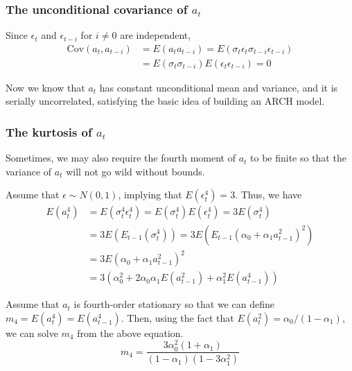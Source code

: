 \documentclass[a4paper,11pt]{article}
\newcommand{\cov}{\mathrm{Cov}}
\begin{document}
\subsubsection{The unconditional covariance of \(a_t\)}
\label{sec:orge3a2147}

Since \(\epsilon_t\) and \(\epsilon_{t-i}\) for \(i \neq 0\) are independent,
\begin{equation*}
\begin{split}
\cov(a_t, a_{t-i}) &= E(a_t a_{t-i}) = E(\sigma_t \epsilon_t \sigma_{t-i} \epsilon_{t-i}) \\
&= E(\sigma_t \sigma_{t-i}) E(\epsilon_t \epsilon_{t-i}) = 0
\end{split}
\end{equation*}

Now we know that \(a_t\) has constant unconditional mean and variance,
and it is serially uncorrelated, satisfying the basic idea of building
an ARCH model.

\subsubsection{The kurtosis of \(a_t\)}
\label{sec:org227f3ab}

Sometimes, we may also require the fourth moment of \(a_t\) to be finite
so that the variance of \(a_t\) will not go wild without bounds.

Assume that \(\epsilon \sim N(0, 1)\), implying that \(E(\epsilon^4_t) =
3\). Thus, we have
\begin{equation*}
\begin{split}
E(a^4_t) &= E(\sigma^4_t \epsilon_t^4) = E(\sigma^4_t) E(\epsilon^4_t) = 3 E(\sigma^4_t) \\
&= 3 E\left( E_{t-1}(\sigma^4_t) \right) = 3 E\left( E_{t-1}(\alpha_0 + \alpha_1 a^2_{t-1})^2  \right) \\
&= 3 E(\alpha_0 + \alpha_1 a^2_{t-1})^2 \\
&= 3\left(\alpha^2_0 + 2\alpha_0\alpha_1 E(a^2_{t-1}) + \alpha^2_1 E(a^4_{t-1}) \right)
\end{split}
\end{equation*}

Assume that \(a_t\) is fourth-order stationary so that we can define
\(m_4 = E(a^4_t) = E(a^4_{t-1})\). Then, using the fact that \(E(a^2_t) =
\alpha_0 /(1-\alpha_1)\), we can solve \(m_4\) from the
above equation.
\[m_4 = \frac{3\alpha^2_0(1+\alpha_1)}{(1-\alpha_1)(1-3\alpha^2_1)} \]
\end{document}
